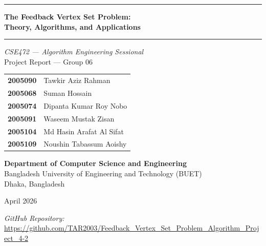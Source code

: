 \documentclass[10pt,a4paper]{report}
\theoremstyle{definition}
\begin{document}
\onehalfspacing

\begin{titlepage}
	\centering
	\vspace*{1cm}

	{\color{buetblue}\rule{\linewidth}{2pt}}
	\vspace{0.6cm}

	{\Huge\bfseries\color{buetblue}
		The Feedback Vertex Set Problem:\\[8pt]
		Theory, Algorithms, and Applications
	}

	\vspace{0.5cm}
	{\color{buetblue}\rule{\linewidth}{2pt}}

	\vspace{1.2cm}

	{\Large\textit{CSE472 --- Algorithm Engineering Sessional}}\\[0.4cm]
	{\large Project Report --- Group 06}

	\vspace{1.4cm}

	\begin{center}
		\begin{tabular}{ll}
			\textbf{2005090} & Tawkir Aziz Rahman       \\[4pt]
			\textbf{2005068} & Suman Hossain            \\[4pt]
			\textbf{2005074} & Dipanta Kumar Roy Nobo   \\[4pt]
			\textbf{2005091} & Waseem Mustak Zisan      \\[4pt]
			\textbf{2005104} & Md Hasin Arafat Al Sifat \\[4pt]
			\textbf{2005109} & Noushin Tabassum Aoishy  \\
		\end{tabular}
	\end{center}

	\vspace{1.4cm}

	{\large
		\textbf{Department of Computer Science and Engineering}\\[0.3cm]
		Bangladesh University of Engineering and Technology (BUET)\\[0.3cm]
		Dhaka, Bangladesh
	}

	\vspace{1.2cm}

	{\large April 2026}

	\vfill

	\begin{center}
		\small\textit{GitHub Repository:}\\
		\url{https://github.com/TAR2003/Feedback_Vertex_Set_Problem_Algorithm_Project_4-2}
	\end{center}
\end{titlepage}
\end{document}
